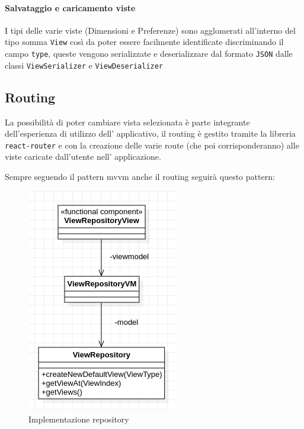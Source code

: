 \paragraph{Salvataggio e caricamento viste}
I tipi delle varie viste (Dimensioni e Preferenze) sono agglomerati all'interno
del tipo somma \texttt{View} così da poter essere facilmente identificate
discriminando il campo \texttt{type}, queste vengono serializzate e
deserializzare dal formato \texttt{JSON} dalle classi \texttt{ViewSerializer} e
\texttt{ViewDeserializer}

\subsection{Routing}
La possibilità di poter cambiare vista selezionata è parte integrante dell'esperienza
di utilizzo dell' applicativo, il routing è gestito tramite la libreria
\texttt{react-router} e con la creazione delle varie route (che poi corrisponderanno)
alle viste caricate dall'utente nell' applicazione.

Sempre seguendo il pattern mvvm anche il routing seguirà questo pattern:
\begin{figure}[h!]
  \centering
  \includegraphics[scale=0.55]{../../assets/classi_uml/viewrepo.png}
  \caption{Implementazione repository}
\end{figure}



